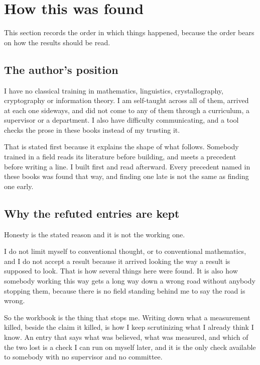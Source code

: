 \chapter*{How this was found}

This section records the order in which things happened, because the order bears on how the results
should be read.

\section*{The author's position}

I have no classical training in mathematics, linguistics, crystallography, cryptography or
information theory. I am self-taught across all of them, arrived at each one sideways, and did not
come to any of them through a curriculum, a supervisor or a department. I also have difficulty
communicating, and a tool checks the prose in these books instead of my trusting it.

That is stated first because it explains the shape of what follows. Somebody trained in a field
reads its literature before building, and meets a precedent before writing a line. I built first and
read afterward. Every precedent named in these books was found that way, and finding one late is not
the same as finding one early.

\section*{Why the refuted entries are kept}

Honesty is the stated reason and it is not the working one.

I do not limit myself to conventional thought, or to conventional mathematics, and I do not accept a
result because it arrived looking the way a result is supposed to look. That is how several things
here were found. It is also how somebody working this way gets a long way down a wrong road without
anybody stopping them, because there is no field standing behind me to say the road is wrong.

So the workbook is the thing that stops me. Writing down what a measurement killed, beside the claim
it killed, is how I keep scrutinizing what I already think I know. An entry that says what was
believed, what was measured, and which of the two lost is a check I can run on myself later, and it
is the only check available to somebody with no supervisor and no committee.

